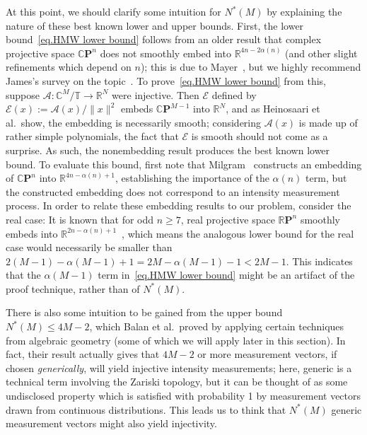 \documentclass[times,10pt]{elsarticle}
\theoremstyle{plain}
\begin{document}
At this point, we should clarify some intuition for $N^*(M)$ by explaining the nature of these best known lower and upper bounds.
First, the lower bound~\eqref{eq.HMW lower bound} follows from an older result that complex projective space $\mathbb{C}\mathbf{P}^n$ does not smoothly embed into $\mathbb{R}^{4n-2\alpha(n)}$ (and other slight refinements which depend on $n$); this is due to Mayer~\cite{Mayer:65}, but we highly recommend James's survey on the topic~\cite{James:71}.
To prove~\eqref{eq.HMW lower bound} from this, suppose $\mathcal{A}\colon\mathbb{C}^M/\mathbb{T}\rightarrow\mathbb{R}^N$ were injective.
Then $\mathcal{E}$ defined by $\mathcal{E}(x):=\mathcal{A}(x)/\|x\|^2$ embeds $\mathbb{C}\mathbf{P}^{M-1}$ into $\mathbb{R}^N$, and as Heinosaari et al.\ show, the embedding is necessarily smooth; considering $\mathcal{A}(x)$ is made up of rather simple polynomials, the fact that $\mathcal{E}$ is smooth should not come as a surprise.
As such, the nonembedding result produces the best known lower bound.
To evaluate this bound, first note that Milgram~\cite{Milgram:67} constructs an embedding of $\mathbb{C}\mathbf{P}^n$ into $\mathbb{R}^{4n-\alpha(n)+1}$, establishing the importance of the $\alpha(n)$ term, but the constructed embedding does not correspond to an intensity measurement process.
In order to relate these embedding results to our problem, consider the real case: 
It is known that for odd $n\geq7$, real projective space $\mathbb{R}\mathbf{P}^n$ smoothly embeds into $\mathbb{R}^{2n-\alpha(n)+1}$~\cite{Steer:70}, which means the analogous lower bound for the real case would necessarily be smaller than $2(M-1)-\alpha(M-1)+1=2M-\alpha(M-1)-1<2M-1$.
This indicates that the $\alpha(M-1)$ term in~\eqref{eq.HMW lower bound} might be an artifact of the proof technique, rather than of $N^*(M)$.

There is also some intuition to be gained from the upper bound $N^*(M)\leq4M-2$, which Balan et al.\ proved by applying certain techniques from algebraic geometry (some of which we will apply later in this section).
In fact, their result actually gives that $4M-2$ or more measurement vectors, if chosen \textit{generically}, will yield injective intensity measurements; here, generic is a technical term involving the Zariski topology, but it can be thought of as some undisclosed property which is satisfied with probability 1 by measurement vectors drawn from continuous distributions.
This leads us to think that $N^*(M)$ generic measurement vectors might also yield injectivity.
\end{document}
